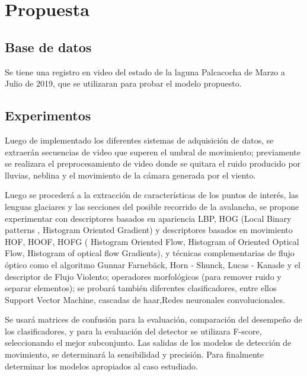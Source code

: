 \documentclass[a4paper,11pt]{report}
\begin{document}
\chapter{Propuesta}



\section{Base de datos}

Se tiene una registro en video del estado de la laguna Palcacocha de Marzo a Julio de 2019,  que se utilizaran para probar el modelo propuesto.

\section{Experimentos}

Luego de implementado los diferentes sistemas de adquisición de datos, se extraerán secuencias de video que superen el umbral de movimiento; previamente se realizara el preprocesamiento de video donde se quitara el ruido producido por lluvias, neblina y el movimiento de la cámara generada por el viento.

Luego se procederá a la extracción de características de los puntos de interés, las lenguas glaciares y las secciones del posible recorrido de la avalancha, se propone experimentar con descriptores  basados en apariencia LBP, HOG (Local Binary patterns
, Histogram Oriented Gradient) y descriptores basados en movimiento HOF, HOOF, HOFG ( Histogram Oriented Flow, Histogram of Oriented Optical Flow, Histogram of optical flow Gradients),  y técnicas complementarias de flujo óptico como el algoritmo Gunnar Farnebäck, Horn - Shunck, Lucas - Kanade  y el descriptor de Flujo Violento; operadores  morfológicos (para remover ruido y separar elementos); se probará también diferentes clasificadores, entre ellos Support Vector Machine, cascadas de haar,Redes neuronales convolucionales. 

Se usará matrices de confusión para la evaluación, comparación del desempeño de los clasificadores, y para la evaluación del detector se utilizara F-score, seleccionando el mejor subconjunto. Las salidas de los modelos de detección de movimiento, se determinará la sensibilidad y precisión. Para finalmente determinar los modelos apropiados al caso estudiado.
\end{document}
